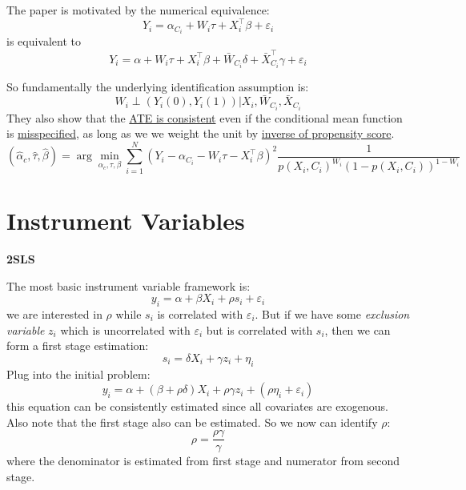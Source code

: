 The paper is motivated by the numerical equivalence:
\[
    Y_{i}=\alpha_{C_{i}}+W_{i} \tau+X_{i}^{\top} \beta+\varepsilon_{i}
\] 
is equivalent to
\[
    Y_{i}=\alpha+W_{i} \tau+X_{i}^{\top} \beta+\bar{W}_{C_{i}} \delta+\bar{X}_{C_{i}}^{\top} \gamma+\varepsilon_{i}
\]

So fundamentally the underlying identification assumption is:
\[
    W_{i} \perp\left(Y_{i}(0), Y_{i}(1)\right) | X_{i}, \bar{W}_{C_{i}}, \bar{X}_{C_{i}}
\]
They also show that the \underline{ATE is consistent} even if the conditional mean function is \underline{misspecified}, as long as we we weight the unit by \underline{inverse of propensity score}.
\[
    \left(\hat{\alpha}_{c}, \hat{\tau}, \hat{\beta}\right)=\arg \min _{\alpha_{c}, \tau, \beta} \sum_{i=1}^{N}\left(Y_{i}-\alpha_{C_{i}}-W_{i} \tau-X_{i}^{\top} \beta\right)^{2} \frac{1}{p\left(X_{i}, C_{i}\right)^{W_{i}}\left(1-p\left(X_{i}, C_{i}\right)\right)^{1-W_{i}}}
\]



\chapter{Instrument Variables} %
\label{cha:instrument_variables}

\textbf{2SLS}

The most basic instrument variable framework is:
\[
    y_i = \alpha + \beta X_i + \rho s_i + \varepsilon_i
\]
we are interested in $\rho$ while $s_i$ is correlated with $\varepsilon_i$.
But if we have some \textit{exclusion variable} $z_i$ which is uncorrelated with $\varepsilon_i$ but is correlated with $s_i$, then we can form a first stage estimation:
\[
    s_i = \delta X_i + \gamma z_i + \eta_i
\]
Plug into the initial problem:
\[
    y_i = \alpha + (\beta + \rho \delta)X_i + \rho \gamma z_i + (\rho \eta_i + \varepsilon_i)
\]
this equation can be consistently estimated since all covariates are exogenous.
Also note that the first stage also can be estimated. So we now can identify $\rho$:
\[
    \rho = \frac{\rho \gamma}{\gamma}
\]
where the denominator is estimated from first stage and numerator from second stage.

